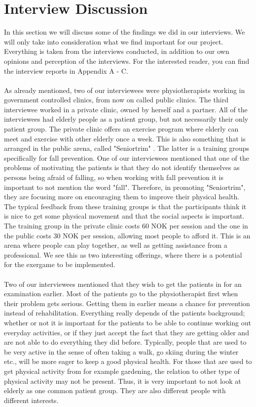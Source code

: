 \chapter{Interview Discussion}
In this section we will discuss some of the findings we did in our interviews. We will only take into consideration what we find important for our project. Everything is taken from the interviews conducted, in addition to our own opinions and perception of the interviews. For the interested reader, you can find the interview reports in Appendix A - C.\\ \\
As already mentioned, two of our interviewees were physiotherapists working in government controlled clinics, from now on called public clinics. The third interviewee worked in a private clinic, owned by herself and a partner. All of the interviewees had elderly people as a patient group, but not necessarily their only patient group. The private clinic offers an exercise program where elderly can meet and exercise with other elderly once a week. This is also something that is arranged in the public arena, called "Seniortrim" \cite{trim}. The latter is a training groups specifically for fall prevention. One of our interviewees mentioned that one of the problems of motivating the patients is that they do not identify themselves as  persons being afraid of falling, so when working with fall prevention it is important to not mention the word "fall". Therefore, in promoting "Seniortrim", they are focusing more on encouraging them to improve their physical health. The typical feedback from these training groups is that the participants think it is nice to get some physical movement and that the social aspects is important. The training group in the private clinic costs 60 NOK per session and the one in the public costs 30 NOK per session, allowing most people to afford it. This is an arena where people can play together, as well as getting assistance from a professional. We see this as two interesting offerings, where there is a potential for the exergame to be implemented.  \\ \\
Two of our interviewees mentioned that they wish to get the patients in for an examination earlier. Most of the patients go to the physiotherapist first when their problem gets serious. Getting them in earlier means a chance for prevention instead of rehabilitation. Everything really depends of the patients background; whether or not it is important for the patients to be able to continue working out everyday activities, or if they just accept the fact that they are getting older and are not able to do everything they did before. Typically, people that are used to be very active in the sense of often taking a walk, go skiing during the winter etc., will be more eager to keep a good physical health. For those that are used to get physical activity from for example gardening, the relation to other type of physical activity may not be present. Thus, it is very important to not look at elderly as one common patient group. They are also different people with different interests.\\ \\
